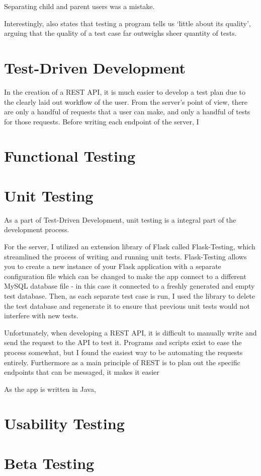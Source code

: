 Separating child and parent users was a mistake.

Interestingly, \cite{4597151} also states that testing a program tells us `little about its quality', arguing that the quality of a test case far outweighs sheer quantity of tests.

\section{Test-Driven Development}
In the creation of a REST API, it is much easier to develop a test plan due to the clearly laid out workflow of the user. From the server's point of view, there are only a handful of requests that a user can make, and only a handful of tests for those requests. Before writing each endpoint of the server, I 

\section{Functional Testing}

\section{Unit Testing}

As a part of Test-Driven Development, unit testing is a integral part of the development process.

For the server, I utilized an extension library of Flask called Flask-Testing, which streamlined the process of writing and running unit tests.
Flask-Testing allows you to create a new instance of your Flask application with a separate configuration file which can be changed to make the app connect to a different MySQL database file - in this case it connected to a freshly generated and empty test database.
Then, as each separate test case is run, I used the library to delete the test database and regenerate it to ensure that previous unit tests would not interfere with new tests.

Unfortunately, when developing a REST API, it is difficult to manually write and send the request to the API to test it.
Programs and scripts exist to ease the process somewhat, but I found the easiest way to be automating the requests entirely. 
Furthermore as a main principle of REST is to plan out the specific endpoints that can be messaged, it makes it easier 



As the app is written in Java, 


\section{Usability Testing}

\section{Beta Testing}